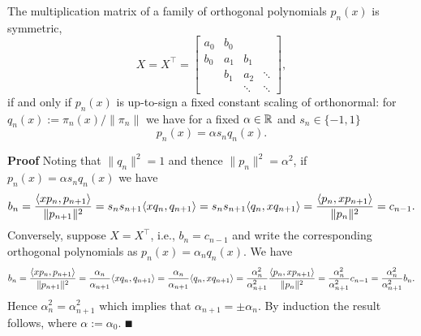 \begin{corollary} The multiplication matrix of a family of orthogonal polynomials $p_n(x)$ is symmetric,
\[
X = X^\ensuremath{\top} = \begin{bmatrix} a_0 & b_0 \\
                                                        b_0 & a_1 & b_1\\
                                                        & b_1 & a_2 & \ensuremath{\ddots} \\
                                                        && \ensuremath{\ddots} & \ensuremath{\ddots}
                                                        \end{bmatrix},
\]
if and only if $p_n(x)$ is up-to-sign a fixed constant scaling of orthonormal: for $q_n(x) := \ensuremath{\pi}_n(x)/\|\ensuremath{\pi}_n\|$ we have for a fixed $\alpha \in {\mathbb R}$ and $s_n \ensuremath{\in} \{-1,1\}$
\[
p_n(x) = \ensuremath{\alpha} s_n q_n(x).
\]
\end{corollary}
\textbf{Proof} Noting that $\|q_n\|^2 = 1$ and thence $\|p_n\|^2 = \ensuremath{\alpha}^2$, if $p_n(x) = \ensuremath{\alpha} s_n q_n(x)$ we have
\[
b_n = {\ensuremath{\langle}xp_n, p_{n+1}\ensuremath{\rangle} \over \|p_{n+1}\|^2} = s_n s_{n+1} \ensuremath{\langle}x q_n, q_{n+1}\ensuremath{\rangle} =
s_n s_{n+1} \ensuremath{\langle}q_n, x q_{n+1}\ensuremath{\rangle} = {\ensuremath{\langle}p_n, xp_{n+1}\ensuremath{\rangle} \over \|p_n\|^2} = c_{n-1}.
\]
Conversely, suppose $X = X^\ensuremath{\top}$, i.e., $b_n = c_{n-1}$ and write the corresponding orthogonal polynomials as $p_n(x) = \ensuremath{\alpha}_n q_n(x)$. We have
\[
b_n = {\ensuremath{\langle}xp_n, p_{n+1}\ensuremath{\rangle} \over \|p_{n+1}\|^2} =
{\ensuremath{\alpha}_n \over \ensuremath{\alpha}_{n+1}} \ensuremath{\langle}xq_n, q_{n+1}\ensuremath{\rangle} =
{\ensuremath{\alpha}_n \over \ensuremath{\alpha}_{n+1}} \ensuremath{\langle}q_n, x q_{n+1}\ensuremath{\rangle} = {\ensuremath{\alpha}_n^2 \over \ensuremath{\alpha}_{n+1}^2} {\ensuremath{\langle}p_n, xp_{n+1}\ensuremath{\rangle} \over \|p_n\|^2}
= {\ensuremath{\alpha}_n^2 \over \ensuremath{\alpha}_{n+1}^2} c_{n-1} = {\ensuremath{\alpha}_n^2 \over \ensuremath{\alpha}_{n+1}^2} b_n.
\]
Hence $\ensuremath{\alpha}_n^2 = \ensuremath{\alpha}_{n+1}^2$ which implies that $\ensuremath{\alpha}_{n+1} = \ensuremath{\pm} \ensuremath{\alpha}_n$. By induction the result follows, where $\ensuremath{\alpha} := \ensuremath{\alpha}_0$. \ensuremath{\QED}

